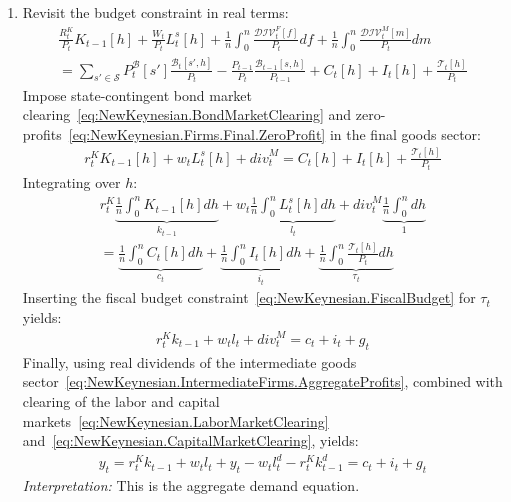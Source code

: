 \begin{enumerate}
\item
Revisit the budget constraint in real terms:
\begin{multline*}
  \frac{R^{K}_{t}}{P_{t}} K_{t-1}[h]
+ \frac{W_{t}}{P_{t}} L^{s}_{t}[h]
+ \frac{1}{n} \int_{0}^{n} \frac{\mathcal{DIV}^{F}_{t}[f]}{P_{t}} df
+ \frac{1}{n} \int_{0}^{n} \frac{\mathcal{DIV}^{M}_{t}[m]}{P_{t}} dm
\\
=
\sum_{s' \in \mathcal{S}} P^{\mathcal{B}}_{t}[s'] \frac{\mathcal{B}_{t}[s',h]}{P_{t}}
- \frac{P_{t-1}}{P_{t}} \frac{\mathcal{B}_{t-1}[s,h]}{P_{t-1}}
+ C_{t}[h]
+ I_{t}[h]
+ \frac{\mathcal{T}_{t}[h]}{P_{t}}
\end{multline*}
Impose state-contingent bond market clearing~\eqref{eq:NewKeynesian.BondMarketClearing}
  and zero-profits~\eqref{eq:NewKeynesian.Firms.Final.ZeroProfit} in the final goods sector:
\begin{align*}
  r^{K}_{t} K_{t-1}[h]
+ w_{t} L^{s}_{t}[h]
+ {div}^{M}_{t}
=
C_{t}[h] + I_{t}[h]
+ \frac{\mathcal{T}_{t}[h]}{P_{t}}
\end{align*}
Integrating over \(h\):
\begin{multline*}
  r^{K}_{t} \underbrace{\frac{1}{n} \int_{0}^{n} K_{t-1}[h] dh}_{k_{t-1}}
+ w_{t} \underbrace{\frac{1}{n} \int_{0}^{n} L^{s}_{t}[h] dh}_{l_{t}}
+ {div}^{M}_{t} \underbrace{\frac{1}{n} \int_{0}^{n} dh}_{1}
\\
=
  \underbrace{\frac{1}{n} \int_{0}^{n} C_{t}[h] dh}_{c_{t}}
+ \underbrace{\frac{1}{n} \int_{0}^{n} I_{t}[h] dh}_{i_{t}}
+ \underbrace{\frac{1}{n} \int_{0}^{n} \frac{\mathcal{T}_{t}[h]}{P_{t}} dh}_{\tau_{t}}
\end{multline*}
Inserting the fiscal budget constraint~\eqref{eq:NewKeynesian.FiscalBudget} for \(\tau_{t}\) yields:
\begin{align*}
  r^{K}_{t} k_{t-1}
+ w_{t} l_{t}
+ {div}^{M}_{t}
=
  c_{t}
+ i_{t}
+ g_{t}
\end{align*}
Finally, using real dividends of the intermediate goods sector~\eqref{eq:NewKeynesian.IntermediateFirms.AggregateProfits},
  combined with clearing of the labor and capital markets~\eqref{eq:NewKeynesian.LaborMarketClearing} and~\eqref{eq:NewKeynesian.CapitalMarketClearing}, yields:
\begin{align*}
y_{t} = 
  r^{K}_{t} k_{t-1}
+ w_{t} l_{t}
+ y_t - w_t l^{d}_{t} - r^{K}_{t} k^{d}_{t-1}
= c_{t} + i_{t} + g_{t}
\end{align*}
\emph{Interpretation:} This is the aggregate demand equation.
	

\end{enumerate}

